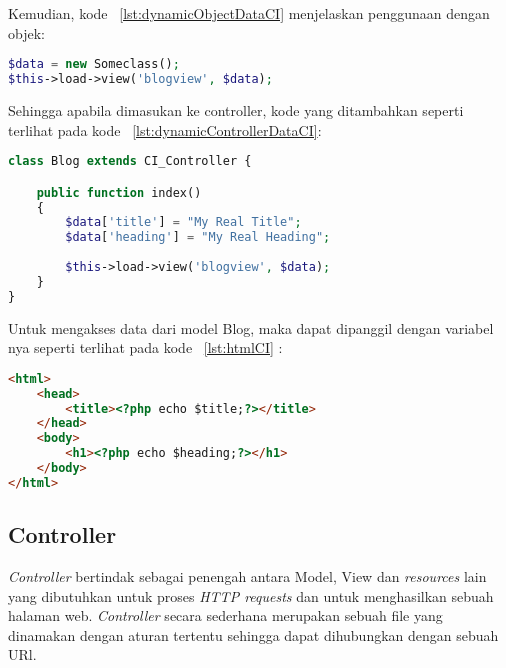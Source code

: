 \noindent Kemudian, kode ~\ref{lst:dynamicObjectDataCI} menjelaskan penggunaan dengan objek:
\begin{lstlisting}[style=customphp, language=PHP, basicstyle=\ttfamily, frame=single, columns=fullflexible, keepspaces=true, breaklines=true, showstringspaces=false, label={lst:dynamicObjectDataCI}, caption=Struktur data dinamis berbentuk objek.] 
$data = new Someclass();
$this->load->view('blogview', $data);
\end{lstlisting}

\noindent Sehingga apabila dimasukan ke controller, kode yang ditambahkan seperti terlihat pada kode ~\ref{lst:dynamicControllerDataCI}:
\begin{lstlisting}[style=customphp, language=PHP, basicstyle=\ttfamily, frame=single, columns=fullflexible, keepspaces=true, breaklines=true, showstringspaces=false, label={lst:dynamicControllerDataCI}, caption=Struktur data dinamis dalam controller.] 
class Blog extends CI_Controller {

	public function index()
	{
		$data['title'] = "My Real Title";
		$data['heading'] = "My Real Heading";
		
		$this->load->view('blogview', $data);
	}
}
\end{lstlisting}

\noindent Untuk mengakses data dari model Blog, maka dapat dipanggil dengan variabel nya seperti terlihat pada kode ~\ref{lst:htmlCI} :
\begin{lstlisting}[style=customhtml, language=HTML, basicstyle=\ttfamily, frame=single, columns=fullflexible, keepspaces=true, breaklines=true, showstringspaces=false, label={lst:htmlCI}, caption=Akses data dinamis dalam file HTML.] 
<html>
	<head>
		<title><?php echo $title;?></title>
	</head>
	<body>
		<h1><?php echo $heading;?></h1>
	</body>
</html>
\end{lstlisting}

\subsection{Controller}
\label{s:controllerCI}
\par \textit{Controller} bertindak sebagai penengah antara Model, View dan \textit{resources} lain yang dibutuhkan untuk proses \textit{HTTP requests} dan untuk menghasilkan sebuah halaman web. \textit{Controller} secara sederhana merupakan sebuah file yang dinamakan dengan aturan tertentu sehingga dapat dihubungkan dengan sebuah URl.



